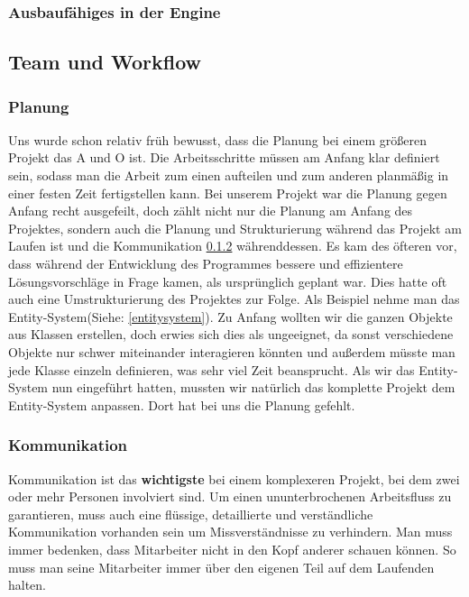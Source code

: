 \subsubsection{Ausbaufähiges in der Engine}

\subsection{Team und Workflow}
\subsubsection{Planung}
Uns wurde schon relativ früh bewusst, dass die Planung bei einem größeren Projekt das A und O ist. Die Arbeitsschritte müssen am Anfang klar definiert sein, sodass man die Arbeit zum einen aufteilen und zum anderen planmäßig in einer festen Zeit fertigstellen kann.
Bei unserem Projekt war die Planung gegen Anfang recht ausgefeilt, doch zählt nicht nur die Planung am Anfang des Projektes, sondern auch die Planung und Strukturierung während das Projekt am Laufen ist und die Kommunikation \ref{kommunikation} währenddessen. Es kam des öfteren vor, dass während der Entwicklung des Programmes bessere und effizientere Lösungsvorschläge in Frage kamen, als ursprünglich geplant war. Dies hatte oft auch eine Umstrukturierung des Projektes zur Folge. Als Beispiel nehme man das Entity-System(Siehe: \ref{entitysystem}). Zu Anfang wollten wir die ganzen Objekte aus Klassen erstellen, doch erwies sich dies als ungeeignet, da sonst verschiedene Objekte nur schwer miteinander interagieren könnten und außerdem müsste man jede Klasse einzeln definieren, was sehr viel Zeit beansprucht. 
Als wir das Entity-System nun eingeführt hatten, mussten wir natürlich das komplette Projekt dem Entity-System anpassen. Dort hat bei uns die Planung gefehlt.
                                                                                      
\subsubsection{Kommunikation}
\label{kommunikation}
Kommunikation ist das \textbf{wichtigste} bei einem komplexeren Projekt, bei dem zwei oder mehr Personen involviert sind. Um einen ununterbrochenen Arbeitsfluss zu garantieren, muss auch eine flüssige, detaillierte und verständliche Kommunikation vorhanden sein um Missverständnisse zu verhindern. Man muss immer bedenken, dass Mitarbeiter nicht in den Kopf anderer schauen können. So muss man seine Mitarbeiter immer über den eigenen Teil auf dem Laufenden halten.

